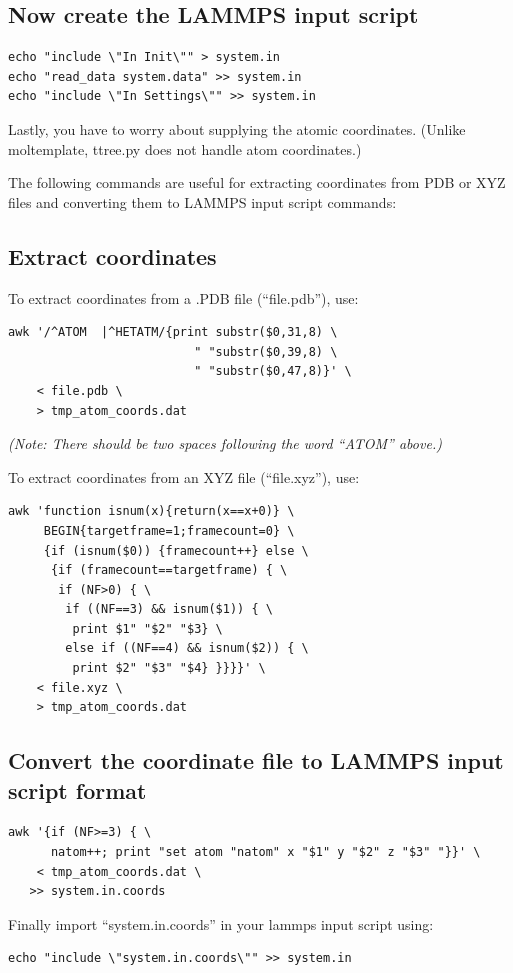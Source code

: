 \documentclass[11pt]{article}
\begin{document}
\subsection{Now create the LAMMPS input script}

\begin{verbatim}
echo "include \"In Init\"" > system.in
echo "read_data system.data" >> system.in
echo "include \"In Settings\"" >> system.in
\end{verbatim}
Lastly, you have to worry about supplying the atomic coordinates.
(Unlike moltemplate, ttree.py does not handle atom coordinates.)

The following commands are useful for extracting coordinates from PDB or XYZ
files and converting them to LAMMPS input script commands:

\subsection{Extract coordinates}
To extract coordinates from a .PDB file (``file.pdb''), use:

\begin{verbatim}
awk '/^ATOM  |^HETATM/{print substr($0,31,8) \
                          " "substr($0,39,8) \
                          " "substr($0,47,8)}' \
    < file.pdb \
    > tmp_atom_coords.dat
\end{verbatim}
\textit{(Note: There should be two spaces following the word ``ATOM'' above.)}


To extract coordinates from an XYZ file (``file.xyz''), use:
\begin{verbatim}
awk 'function isnum(x){return(x==x+0)} \
     BEGIN{targetframe=1;framecount=0} \
     {if (isnum($0)) {framecount++} else \
      {if (framecount==targetframe) { \
       if (NF>0) { \
        if ((NF==3) && isnum($1)) { \
         print $1" "$2" "$3} \
        else if ((NF==4) && isnum($2)) { \
         print $2" "$3" "$4} }}}}' \
    < file.xyz \
    > tmp_atom_coords.dat
\end{verbatim}

\subsection{Convert the coordinate file to LAMMPS input script format}

\begin{verbatim}
awk '{if (NF>=3) { \
      natom++; print "set atom "natom" x "$1" y "$2" z "$3" "}}' \
    < tmp_atom_coords.dat \
   >> system.in.coords
\end{verbatim}
Finally import ``system.in.coords'' in your lammps input script using:
\begin{verbatim}
echo "include \"system.in.coords\"" >> system.in
\end{verbatim}
\end{document}

